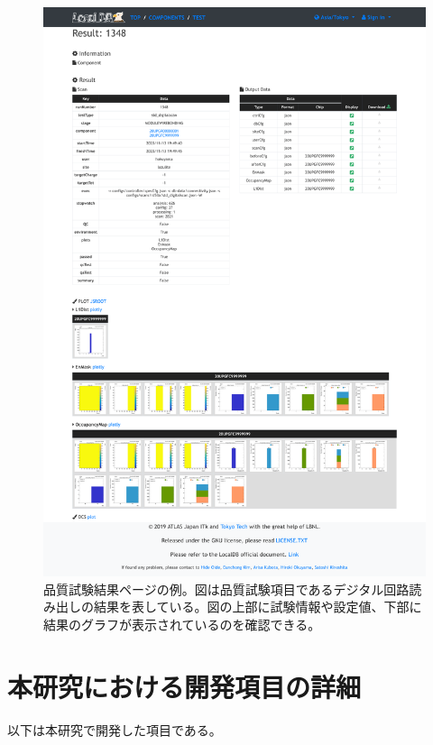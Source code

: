 \begin{figure}[bpt]\centering
\includegraphics[width=15cm]{./demo_view_scan_result.pdf}
\caption[品質試験結果ページの例]{品質試験結果ページの例。図は品質試験項目であるデジタル回路読み出しの結果を表している。図の上部に試験情報や設定値、下部に結果のグラフが表示されているのを確認できる。}
\label{viewer_result}
\end{figure}


\clearpage
\section{本研究における開発項目の詳細}
以下は本研究で開発した項目である。

